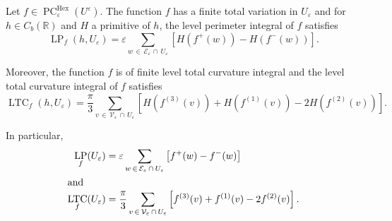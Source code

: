 \documentclass[10pt]{amsart}
\theoremstyle{definition}\newtheorem{defi}[theo]{Definition}\newtheorem{rema}[theo]{Remark}\newtheorem{exam}[theo]{Example}\newtheorem{exem}[theo]{Example}\newtheorem{nota}[theo]{Notation}
\newcommand{\R}{\mathbb{R}}
\newcommand{\eps}{\varepsilon}
\DeclareMathOperator{\LTC}{LTC}
\DeclareMathOperator{\LP}{LP}
\DeclareMathOperator{\PC}{PC}
\DeclareMathOperator{\Hex}{Hex}
\newcommand{\calV}{\mathcal{V}}
\newcommand{\calE}{\mathcal{E}}
\begin{document}
\begin{prop}\label{level-int-discr:prop}
Let $f\in\PC^{\Hex}_\eps(U^{\eps})$. The function $f$ has a finite total variation in $U_\eps$ and for $h\in C_b(\R)$ and $H$ a primitive of $h$, the level perimeter integral of $f$ satisfies
\[
\LP_f\left(h,U_\eps\right)= \eps \sum_{w\,\in\,\calE_\eps\,\cap\,U_\eps} \left[H\left(f^+(w)\right) - H\left(f^-(w)\right)\right].
\]

Moreover, the function $f$ is of finite level total curvature integral and the level total curvature integral of $f$ satisfies
\[
\LTC_{f}(h,U_\eps)=\frac{\pi}{3}
\sum_{v\,\in\,\calV_\varepsilon\,\cap\,U_\eps} \left[H\left(f^{(3)}(v)\right) + H\left(f^{(1)}(v)\right)-2H\left(f^{(2)}(v)\right)\right].
\]

In particular,
\begin{align*}
\LP_f(U_\eps)&=\eps \sum_{w\,\in\,\calE_\eps\,\cap\,U_\eps} \left[f^+(w) -
f^-(w)\right]
\\
\intertext{and}
\LTC_{f}(U_\eps)&=\frac{\pi}{3}
\sum_{v\,\in\,{\calV}_\varepsilon\,\cap\,U_\eps} \left[f^{(3)}(v) +
f^{(1)}(v)-2f^{(2)}(v)\right].
\end{align*}
\end{prop}
\end{document}
